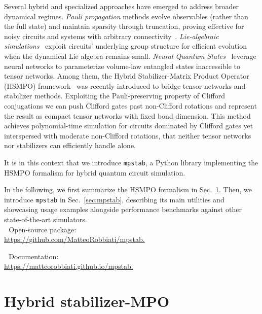 \documentclass[pra,aps,twocolumn,longbibliography,preprintnumbers,superscriptaddress,nofootnotebib,10pt]{revtex4-2}
\begin{document}
Several hybrid and specialized approaches have emerged to address broader dynamical regimes. \textit{Pauli propagation} methods evolve observables (rather than the full state) and maintain sparsity through truncation, proving effective for noisy circuits and systems with arbitrary connectivity~\cite{Rudolph_2025}. \textit{Lie-algebraic simulations}~\cite{Goh_2025} exploit circuits' underlying group structure for efficient evolution when the dynamical Lie algebra remains small. \textit{Neural Quantum States}~\cite{Lange_2024} leverage neural networks to parameterize volume-law entangled states inaccessible to tensor networks. 
Among them, the Hybrid Stabilizer-Matrix Product Operator (HSMPO) framework~\cite{Mello_2024} was recently introduced to bridge tensor networks and stabilizer methods. Exploiting the Pauli-preserving property of Clifford conjugations we can push Clifford gates past non-Clifford rotations and represent the result as compact tensor networks with fixed bond dimension. This method achieves polynomial-time simulation for circuits dominated by Clifford gates yet interspersed with moderate non-Clifford rotations, that neither tensor networks nor stabilizers can efficiently handle alone.

It is in this context that we introduce \texttt{mpstab}, a Python library implementing the HSMPO formalism for hybrid quantum circuit simulation.

In the following, we first summarize the HSMPO formalism in Sec.~\ref{sec:hsmpo}. Then, we introduce \texttt{mpstab} in Sec.~\ref{sec:mpstab}, 
describing its main utilities and showcasing usage examples alongside performance benchmarks against other state-of-the-art simulators. \\

\faGithub\,\, Open-source package: \\ \href{https://github.com/MatteoRobbiati/mpstab}{https://github.com/MatteoRobbiati/mpstab.} 

\faBook \,\, Documentation: \\ \href{ https://matteorobbiati.github.io/mpstab/}{ https://matteorobbiati.github.io/mpstab.}

\section{Hybrid stabilizer-MPO}
\label{sec:hsmpo}
\end{document}
